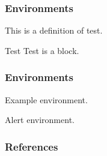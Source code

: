\documentclass[aspectratio=169]{beamer}
\begin{document}
\begin{frame}
  \frametitle{Environments}
  \begin{definition}[Test]
    This is a definition of test.
  \end{definition}
  \begin{block}{Test}
    Test is a block.
  \end{block}
\end{frame}

\begin{frame}
  \frametitle{Environments}
  \begin{example}
    Example environment.
  \end{example}
  \begin{alertblock}
    Alert environment.
  \end{alertblock}
\end{frame}

\begin{frame}[allowframebreaks]
  \frametitle{References}
  \printbibliography
\end{frame}
\end{document}
